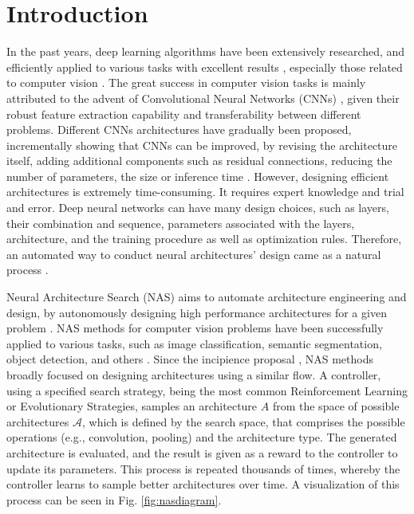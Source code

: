 \documentclass[10pt, conference]{IEEEtran}
\begin{document}
\IEEEpeerreviewmaketitle








\section{Introduction}
In the past years, deep learning algorithms have been extensively researched, and efficiently applied to various tasks with excellent results \cite{deng2014deep, goodfellow2016deep}, especially those related to computer vision \cite{voulodimos2018deep}. The great success in computer vision tasks is mainly attributed to the advent of Convolutional Neural Networks (CNNs) \cite{khan2020survey}, given their robust feature extraction capability and transferability between different problems. Different CNNs architectures have gradually been proposed, incrementally showing that CNNs can be improved, by revising the architecture itself, adding additional components such as residual connections, reducing the number of parameters, the size or inference time \cite{DBLP:conf/nips/KrizhevskySH12, DBLP:journals/corr/SimonyanZ14a, DBLP:conf/cvpr/SzegedyLJSRAEVR15, DBLP:conf/cvpr/HeZRS16, DBLP:conf/cvpr/HuangLMW17, DBLP:conf/icml/TanL19}. However, designing efficient architectures is extremely time-consuming. It requires expert knowledge and trial and error. Deep neural networks can have many design choices, such as layers, their combination and sequence, parameters associated with the layers, architecture, and the training procedure as well as optimization rules. Therefore, an automated way to conduct neural architectures' design came as a natural process \cite{hutter2019automated}.


Neural Architecture Search (NAS) aims to automate architecture engineering and design, by autonomously designing high performance architectures for a given problem \cite{elsken2019neural}. NAS methods for computer vision problems have been successfully applied to various tasks, such as image classification, semantic segmentation, object detection, and others \cite{elsken2019neural, DBLP:journals/corr/abs-1905-01392}. Since the incipience proposal \cite{DBLP:conf/iclr/ZophL17}, NAS methods broadly focused on designing architectures using a similar flow. A controller, using a specified search strategy, being the most common Reinforcement Learning or Evolutionary Strategies, samples an architecture $A$ from the space of possible architectures $\mathcal{A}$, which is defined by the search space, that comprises the possible operations (e.g., convolution, pooling) and the architecture type. The generated architecture is evaluated, and the result is given as a reward to the controller to update its parameters. This process is repeated thousands of times, whereby the controller learns to sample better architectures over time. A visualization of this process can be seen in Fig. \ref{fig:nasdiagram}.
\end{document}
